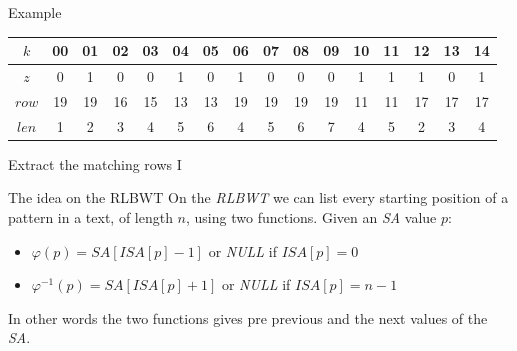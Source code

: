 \documentclass{beamer}
\begin{document}
\begin{frame}{Example}
{\begin{block}{}
      \begin{table}[H]
        \footnotesize{}
        \centering
        \begin{tabular}{c|ccccccccccccccc}
          $k$ & 00 & 01 & 02 & 03 & 04 &  {\color{nordgreen}05} & 06 & 07 & 08
          &  {\color{nordgreen}09} & 10 &  {\color{nordgreen}11} & 12 & 13
          &  {\color{nordgreen}14} \\
          \hline
          $z$ & 0 & 1 & 0 & 0 & 1 &  {\color{nordgreen}0} & 1 & 0 & 0
          &  {\color{nordgreen}0} & 1 &  {\color{nordgreen}1} & 1 & 0
          &  {\color{nordgreen}1} \\
          $row$ & 19 & 19 & 16 & 15 & 13 &  {\color{nordgreen}13} & 19 & 19 & 19
          &  {\color{nordgreen}19} & 11 &  {\color{nordgreen}11} & 17 & 17
          &  {\color{nordgreen}17} \\
          $len$ & 1 & 2 & 3 & 4 & 5 & {\color{nordgreen}6} & 4 & 5 & 6
          & {\color{nordgreen}7} & 4 & {\color{nordgreen}5} & 2 & 3
          & {\color{nordgreen}4}\\
        \end{tabular}
      \end{table}
    \end{block}
  }
\end{frame}
\begin{frame}{Extract the matching rows I}
  \begin{block}{The idea on the RLBWT}
    On the \textit{RLBWT} we can list every starting position of a pattern in a
    text, of length $n$, using two functions. Given an \textit{SA} value $p$:
    \begin{itemize}
      \item $\varphi(p)=SA[ISA[p]-1]$ or \textit{NULL} if $ISA[p]=0$
      \item $\varphi^{-1}(p)=SA[ISA[p]+1]$ or \textit{NULL} if $ISA[p]=n-1$
    \end{itemize}
    In other words the two functions gives pre previous and the next values of
    the \textit{SA}.
  \end{block}
\end{frame}
\end{document}
